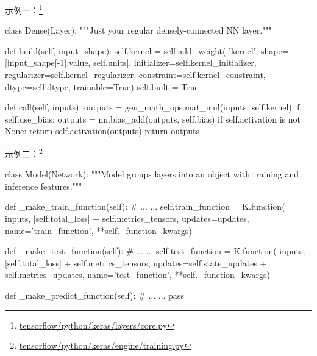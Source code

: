 \begin{frame}[fragile]
    示例一：\footnote{\href{https://github.com/tensorflow/tensorflow/blob/60c56a4103e9f9239b9b7b104a846619dc4ecc20/tensorflow/python/keras/layers/core.py\#L845}{tensorflow/python/keras/layers/core.py}}

    \begin{tcblisting}{}
        class Dense(Layer):
          """Just your regular densely-connected NN layer."""

          def build(self, input_shape):
            self.kernel = self.add_weight(
                'kernel',
                shape=[input_shape[-1].value, self.units],
                initializer=self.kernel_initializer,
                regularizer=self.kernel_regularizer,
                constraint=self.kernel_constraint,
                dtype=self.dtype,
                trainable=True)
            self.built = True

          def call(self, inputs):
            outputs = gen_math_ops.mat_mul(inputs, self.kernel)
            if self.use_bias:
              outputs = nn.bias_add(outputs, self.bias)
            if self.activation is not None:
              return self.activation(outputs)
            return outputs
    \end{tcblisting}
\end{frame}

\begin{frame}[fragile]
    示例二：\footnote{\href{https://github.com/tensorflow/tensorflow/blob/60c56a4103e9f9239b9b7b104a846619dc4ecc20/tensorflow/python/keras/engine/training.py\#L54}{tensorflow/python/keras/engine/training.py}}

    \begin{tcblisting}{}
        class Model(Network):
          """Model groups layers into an object with training and inference features."""

          def _make_train_function(self):
            # ... ...
            self.train_function = K.function(
                inputs, [self.total_loss] + self.metrics_tensors,
                updates=updates,
                name='train_function',
                **self._function_kwargs)

          def _make_test_function(self):
             # ... ...
             self.test_function = K.function(
                 inputs, [self.total_loss] + self.metrics_tensors,
                 updates=self.state_updates + self.metrics_updates,
                 name='test_function',
                 **self._function_kwargs)

          def _make_predict_function(self):
            # ... ...
            pass
    \end{tcblisting}
\end{frame}

